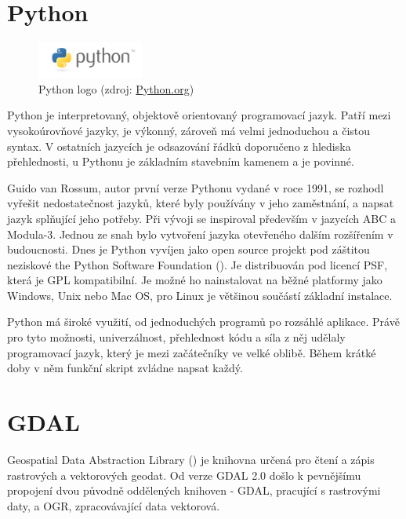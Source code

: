 
\section{Python}

\begin{figure}[H]
    \centering
      \includegraphics[width=100pt]{./pictures/python-logo-master-v3-TM.png}
      \caption[Python logo]{Python logo 
      (zdroj: \href{https://www.python.org/static/community_logos/python-logo-master-v3-TM.png}{Python.org})}
      \label{fig:python}
  \end{figure}
  
Python je interpretovaný, objektově orientovaný programovací jazyk. Patří mezi vysokoúrovňové jazyky, je výkonný, zároveň má velmi jednoduchou a čistou syntax. V ostatních jazycích je odsazování řádků doporučeno z hlediska přehlednosti, u Pythonu je základním stavebním kamenem a je povinné. 

Guido van Rossum, autor první verze Pythonu vydané v roce 1991, se rozhodl vyřešit nedostatečnost jazyků, které byly používány v jeho zaměstnání, a napsat jazyk splňující jeho potřeby. Při vývoji se inspiroval především v jazycích ABC a Modula-3. Jednou ze snah bylo vytvoření jazyka otevřeného dalším rozšířením v budoucnosti. Dnes je Python vyvíjen jako open source projekt pod záštitou neziskové the Python Software Foundation (). Je distribuován pod licencí PSF, která je GPL kompatibilní. Je možné ho nainstalovat na běžné platformy jako Windows, Unix nebo Mac OS, pro Linux je většinou součástí základní instalace. 

Python má široké využití, od jednoduchých programů po rozsáhlé aplikace. Právě pro tyto možnosti, univerzálnost, přehlednost kódu a síla z něj udělaly programovací jazyk, který je mezi začátečníky ve velké oblibě. Během krátké doby v něm funkční skript zvládne napsat každý. 
  
  
\section{GDAL}  

Geospatial Data Abstraction Library () je knihovna určená pro čtení a zápis rastrových a vektorových geodat. Od verze GDAL 2.0 došlo k pevnějšímu propojení dvou původně oddělených knihoven - GDAL, pracující s rastrovými daty, a OGR, zpracovávající data vektorová.

